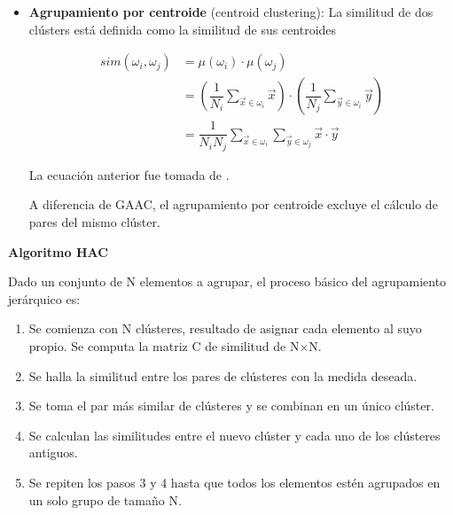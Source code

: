 \documentclass{llncs}
\begin{document}
\begin{itemize}
	La ecuaci\'on anterior fue tomada de \cite[Ecuaci\'on 17.1, p.389]{B1}
	
	Esta evalúa la calidad de un clúster basada en todas las similitudes entre documentos, evitando así castigar valores extremos como en los criterios de enlace único y enlace completo, que establecen la similitud del cl\'uster con la similitud de un solo par de documentos.
	
	\vspace{1em}
	\item \textbf{Agrupamiento por centroide} (centroid clustering): La similitud de dos cl\'usters est\'a definida como la similitud de sus centroides

		\begin{align}
			sim(\omega_{i}, \omega_{j}) &= \mu(\omega_{i})\cdot\mu(\omega_{j}) \nonumber\\
			&= \left(\dfrac{1}{N_{i}}\sum_{\overrightarrow{x} \in \omega_{i}}\overrightarrow{x}\right) \cdot \left(\dfrac{1}{N_{j}}\sum_{\overrightarrow{y} \in \omega_{i}}\overrightarrow{y}\right) \nonumber\\
			& = \dfrac{1}{N_{i}N_{j}} \sum_{\overrightarrow{x} \in \omega_{i}}\sum_{\overrightarrow{y} \in \omega_{j}}\overrightarrow{x}\cdot\overrightarrow{y} \nonumber
		\end{align}
	
	La ecuaci\'on anterior fue tomada de  \cite[Ecuaci\'on 17.6, p.391]{B1}.
	
	A diferencia de GAAC, el agrupamiento por centroide excluye el c\'alculo de pares del mismo cl\'uster.
\end{itemize}

\vspace{1em}
\textbf{Algoritmo HAC}

Dado un conjunto de N elementos a agrupar, el proceso básico del agrupamiento jerárquico es:
\begin{enumerate}
	\item Se comienza con N cl\'usteres, resultado de asignar cada elemento al suyo propio. Se computa la matriz C de similitud de N×N.
	
	\item Se halla la similitud entre los pares de cl\'usteres con la medida deseada.
	
	\item Se toma el par más similar de clústeres y se combinan en un único clúster.
	
	\item Se calculan las similitudes entre el nuevo clúster y cada uno de los cl\'usteres antiguos.
	
	\item Se repiten los pasos 3 y 4 hasta que todos los elementos estén agrupados en un solo grupo de tamaño N.
\end{enumerate}
\end{document}
